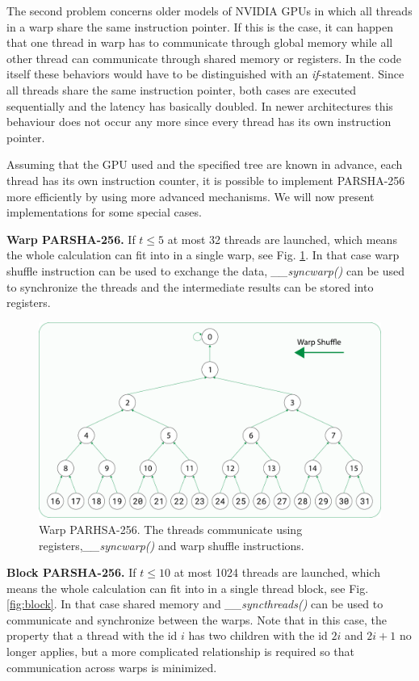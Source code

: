 \documentclass[letterpaper]{article}
\newcommand{\mypar}[1]{{\bf #1.}}
\begin{document}
The second problem concerns older models of NVIDIA GPUs in which all threads in a warp share the same instruction pointer. If this is the case, it can happen that one thread in warp has to communicate through global memory while all other thread can communicate through shared memory or registers.
In the code itself these behaviors would have to be distinguished with an \emph{if}-statement. Since all threads share the same instruction pointer, both cases are executed sequentially and the latency has basically doubled. In newer architectures this behaviour does not occur any more since every thread has its own instruction pointer.

Assuming that the GPU used and the specified tree are known in advance, each thread has its own instruction counter, it is possible to implement PARSHA-256 more efficiently by using more advanced mechanisms. We will now present implementations for some special cases.

\mypar{Warp PARSHA-256} If $t \leq 5$ at most 32 threads are launched, which means the whole calculation can fit into in a single warp, see Fig. \ref{fig:warp}. In that case warp shuffle instruction can be used to exchange the data, \emph{\_\_syncwarp()} can be used to synchronize the threads and the intermediate results can be stored into registers.

\begin{figure}[t]\centering
\includegraphics[scale=0.15]{warp2.pdf}
  \caption{Warp PARHSA-256. The threads communicate using registers,\emph{\_\_syncwarp()} and warp shuffle instructions. \label{fig:warp}}
\end{figure}


\mypar{Block PARSHA-256} If $t \leq 10$ at most 1024 threads are launched, which means the whole calculation can fit into in a single thread block, see Fig. \ref{fig:block}. In that case shared memory and \emph{\_\_syncthreads()} can be used to communicate and synchronize between the warps. Note that in this case, the property that a thread with the id $i$ has two children with the id $2i$ and $2i+1$ no longer applies, but a more complicated relationship is required so that communication across warps is minimized.
\end{document}
